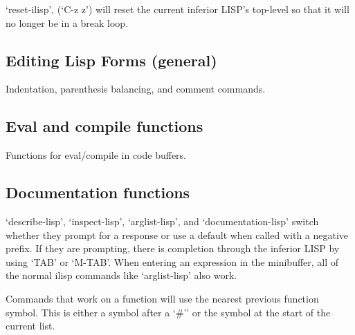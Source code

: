    `reset-ilisp', (`C-z z') will reset the current inferior LISP's
top-level so that it will no longer be in a break loop.



\subsection{Editing Lisp Forms (general)}

Indentation, parenthesis balancing, and comment commands.

\key{close-all-lisp}{]}


\subsection{Eval and compile functions}

Functions for eval/compile in code buffers.

\key{close-and-send-lisp}{C-]}


\subsection{Documentation functions}

`describe-lisp', `inspect-lisp', `arglist-lisp', and
`documentation-lisp' switch whether they prompt for a response or use a
default when called with a negative prefix. If they are prompting,
there is completion through the inferior LISP by using `TAB' or
`M-TAB'. When entering an expression in the minibuffer, all of the
normal ilisp commands like `arglist-lisp' also work.

   Commands that work on a function will use the nearest previous
function symbol. This is either a symbol after a `\#'' or the symbol at
the start of the current list.

